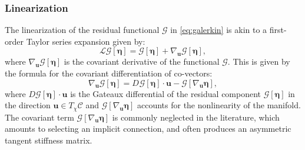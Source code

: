 \hypertarget{sec:linearization}{%
\subsubsection{Linearization}\label{sec:linearization}}

The linearization of the residual functional \(\mathcal{G}\)
in \eqref{eq:galerkin} is akin to a first-order Taylor series expansion
given by:
%
\begin{equation}
\mathscr{L} \mathcal{G}\left[\bm{\eta} \right]
=\mathcal{G}\left[\bm{\eta}\right] + \nabla_{\bm{u}} \mathcal{G}\left[\bm{\eta}\right],
\label{eq:galerkin-linearized}
\end{equation}
where
\(\nabla_{\bm{u}}\mathcal{G}[\bm{\eta}]\) is the covariant derivative of
the functional \(\mathcal{G}\).
This is given by the formula for the covariant differentiation of co-vectors: %
\begin{equation}
\nabla_{\bm{u}}\mathcal{G}\left[\bm{\eta}\right] =
D_{}\mathcal{G}\left[\bm{\eta}\right]\cdot \bm{u}-\mathcal{G}\left[\nabla_{\bm{u}} \bm{\eta}\right],
\label{eq:galerkin-linearized1}
\end{equation}
where \(D\mathcal{G}\left[\bm{\eta}\right]\cdot\bm{u}\) is the
Gateaux differential of the residual component
\(\mathcal{G}\left[\bm{\eta}\right]\) in the direction
\(\bm{u} \in T_\chi \mathscr{C}\) and
\(\mathcal{G}\left[\nabla_{\bm{u}}\bm{\eta}\right]\) accounts for the
nonlinearity of the manifold.
The covariant term \(\mathcal{G}\left[\nabla_{\bm{u}}\bm{\eta}\right]\) is commonly
neglected in the literature, which amounts to selecting an implicit connection, and often produces an asymmetric tangent stiffness matrix.

